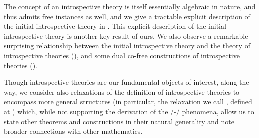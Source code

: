 The concept of an introspective theory is itself essentially algebraic in nature, and thus admits free instances as well, and we give a tractable explicit description of the initial introspective theory in . This explicit description of the initial introspective theory is another key result of ours. We also observe a remarkable surprising relationship between the initial introspective theory and the theory of introspective theories (), and some dual co-free constructions of introspective theories ().

Though introspective theories are our fundamental objects of interest, along the way, we consider also relaxations of the definition of introspective theories to encompass more general structures (in particular, the relaxation we call , defined at ) which, while not supporting the derivation of the \Godel/-\Lob/ phenomena, allow us to state other theorems and constructions in their natural generality and note broader connections with other mathematics.


\fileend